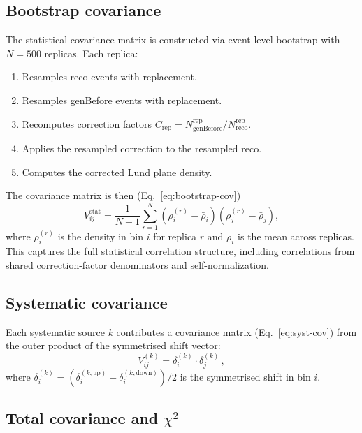 \documentclass[11pt,a4paper]{article}
\begin{document}
\subsection{Bootstrap covariance}
\label{sec:bootstrap}

The statistical covariance matrix is constructed via event-level
bootstrap with $N = 500$ replicas.  Each replica:
\begin{enumerate}
\item Resamples reco events with replacement.
\item Resamples genBefore events with replacement.
\item Recomputes correction factors
  $C_\text{rep} = N_\text{genBefore}^\text{rep} /
  N_\text{reco}^\text{rep}$.
\item Applies the resampled correction to the resampled reco.
\item Computes the corrected Lund plane density.
\end{enumerate}

The covariance matrix is then (Eq.~\eqref{eq:bootstrap-cov})
\begin{equation}
  V_{ij}^\text{stat} = \frac{1}{N-1}
  \sum_{r=1}^{N}
  \left(\rho_i^{(r)} - \bar{\rho}_i\right)
  \left(\rho_j^{(r)} - \bar{\rho}_j\right),
  \label{eq:bootstrap-cov}
\end{equation}
where $\rho_i^{(r)}$ is the density in bin $i$ for replica $r$ and
$\bar{\rho}_i$ is the mean across replicas.  This captures the full
statistical correlation structure, including correlations from shared
correction-factor denominators and self-normalization.

\subsection{Systematic covariance}
\label{sec:syst-cov}

Each systematic source $k$ contributes a covariance matrix
(Eq.~\eqref{eq:syst-cov}) from the outer product of the symmetrised
shift vector:
\begin{equation}
  V_{ij}^{(k)} = \delta_i^{(k)} \cdot \delta_j^{(k)}\,,
  \label{eq:syst-cov}
\end{equation}
where $\delta_i^{(k)} = (\delta_i^{(k,\text{up})} -
\delta_i^{(k,\text{down})}) / 2$ is the symmetrised shift in bin $i$.

\subsection{Total covariance and $\chi^2$}
\label{sec:total-cov}
\end{document}
